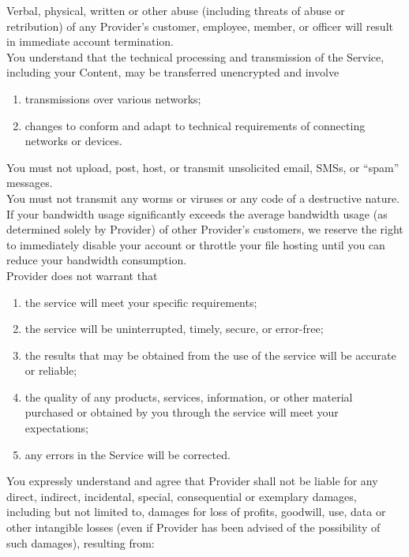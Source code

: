 \documentclass{article}
\begin{document}
\noindent 
Verbal, physical, written or other abuse (including threats of abuse or retribution) of any Provider’s customer, employee, member, or officer will result in immediate account termination.\\

\noindent 
You understand that the technical processing and transmission of the Service, including 
your Content, may be transferred unencrypted and involve \\

\begin{enumerate}
\item transmissions over various networks; 
\item changes to conform and adapt to technical requirements of connecting networks or devices.
\end{enumerate}
You must not upload, post, host, or transmit unsolicited email, SMSs, or “spam” messages.\\

\noindent 
You must not transmit any worms or viruses or any code of a destructive nature.\\

\noindent 
If your bandwidth usage significantly exceeds the average bandwidth usage (as determined 
solely by Provider) of other Provider’s customers, we reserve the right to immediately 
disable your account or throttle your file hosting until you can reduce your bandwidth consumption.\\

\noindent 
Provider does not warrant that 

\begin{enumerate}
\item the service will meet your specific requirements;
\item the service will be uninterrupted, timely, secure, or error-free;
\item the results that may be obtained from the use of the service will be accurate or reliable; 
\item the quality of any products, services, information, or other material purchased or obtained 
      by you through the service will meet your expectations; 
\item any errors in the Service will be corrected.
\end{enumerate}
You expressly understand and agree that Provider shall not be liable for any direct, indirect, incidental, special, consequential or exemplary damages, including but not limited to, damages for loss of profits, goodwill, use, data or other intangible losses (even if Provider has been advised of the possibility of such damages), resulting from: 
\end{document}

